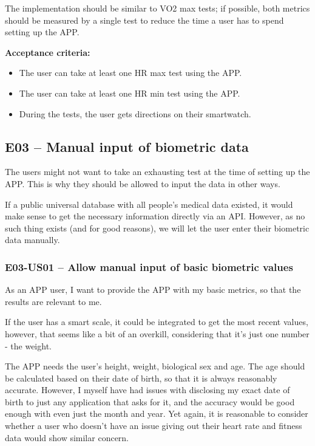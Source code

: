 The implementation should be similar to VO2 max tests; if possible, both metrics should be measured by a single test to reduce the time a user has to spend setting up the APP.

\textbf{Acceptance criteria:}
\begin{itemize}
    \item The user can take at least one HR max test using the APP.
    \item The user can take at least one HR min test using the APP.
    \item During the tests, the user gets directions on their smartwatch.
\end{itemize}


\subsection*{E03 -- Manual input of biometric data}
The users might not want to take an exhausting test at the time of setting up the APP.
This is why they should be allowed to input the data in other ways.

If a public universal database with all people's medical data existed, it would make sense to get the necessary information directly via an API.
However, as no such thing exists (and for good reasons), we will let the user enter their biometric data manually.

\subsubsection*{E03-US01 -- Allow manual input of basic biometric values}
As an APP user, I want to provide the APP with my basic metrics, so that the results are relevant to me.

If the user has a smart scale, it could be integrated to get the most recent values, however, that seems like a bit of an overkill, considering that it's just one number - the weight.

The APP needs the user's height, weight, biological sex and age.
The age should be calculated based on their date of birth, so that it is always reasonably accurate.
However, I myself have had issues with disclosing my exact date of birth to just any application that asks for it, and the accuracy would be good enough with even just the month and year.
Yet again, it is reasonable to consider whether a user who doesn't have an issue giving out their heart rate and fitness data would show similar concern.

